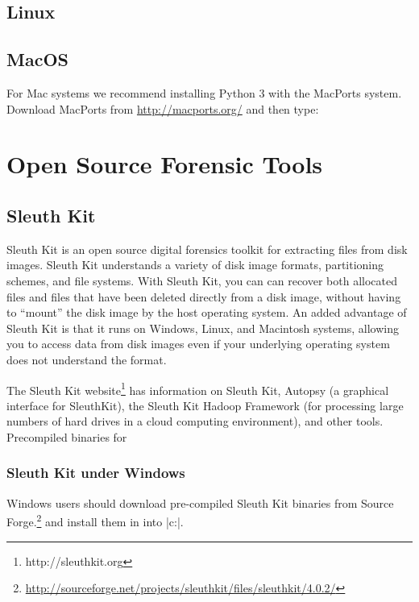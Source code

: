 \subsection{Linux}

\subsection{MacOS}

For Mac systems we recommend installing Python 3 with the MacPorts
system. Download MacPorts from \url{http://macports.org/} and then type:



\section{Open Source Forensic Tools}

\subsection{Sleuth Kit}

Sleuth Kit is an open source digital forensics toolkit for extracting
files from disk images. Sleuth Kit understands a variety of disk image
formats, partitioning schemes, and file systems. With Sleuth Kit, you can can recover
both allocated files and files that have been deleted directly from a
disk image, without having to ``mount'' the disk image by the host
operating system. An added advantage of Sleuth Kit is that it runs on
Windows, Linux, and Macintosh systems, allowing you to access data
from disk images even if your underlying operating system does not
understand the format.

The Sleuth Kit website\footnote{http://sleuthkit.org} has information
on Sleuth Kit, Autopsy (a graphical interface for SleuthKit), the
Sleuth Kit Hadoop Framework (for processing large numbers of hard
drives in a cloud computing environment), and other tools. 
Precompiled binaries for

\subsubsection{Sleuth Kit under Windows}
Windows users should download pre-compiled Sleuth Kit binaries from Source
Forge.\footnote{\url{http://sourceforge.net/projects/sleuthkit/files/sleuthkit/4.0.2/}}
and install them in into |c:\sleuthkit|.

